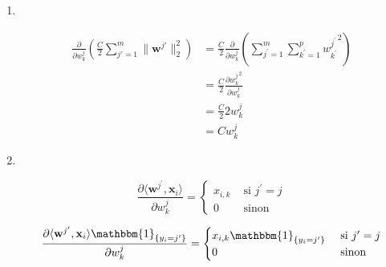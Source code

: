 \documentclass[11pt, french, english]{article}
\def\wkj{w_{k}^{j}}
\begin{document}
\begin{enumerate}
	\item {}\\
	      \begin{reponse}
		      \begin{align*}
			      \frac{\partial}{\partial w_k^j}\left(\frac{C}{2}\sum_{j'=1}^{m} \lVert \mathbf{w}^{j'} \rVert_2^2 \right)
			       & = \frac{C}{2} \frac{\partial}{\partial w_k^j}\left(\sum_{j^{\prime}=1}^{m}\sum_{k^{\prime}=1}^{p} {w_{k^{\prime}}^{j^{\prime}}}^{2}\right) \\
			       & = \frac{C}{2} \frac{\partial {w_{k}^{j}}^2}{\partial w_k^j}                                                                                \\
			       & = \frac{C}{2} 2 w_{k}^{j}                                                                                                                  \\
			       & = Cw_{k}^{j}
		      \end{align*}
	      \end{reponse}

	\item {}\\
	      \begin{reponse}

		      \begin{equation}
			      \label{eq:deriv_prod_scal}
			      \frac{\partial \langle \mathbf{w}^{j^{\prime}}, \mathbf{x}_i \rangle}{\partial\wkj}
			      = \begin{cases}
				      x_{i,k} & \text{ si } j^{\prime} = j \\
				      0       & \text{ sinon }
			      \end{cases}
		      \end{equation}

		      \begin{equation}
			      \label{eq:deriv_prod_scal_1}
			      \frac{\partial \langle \mathbf{w}^{j^{\prime}}, \mathbf{x}_i \rangle\mathbbm{1}_{\{y_i = j^{\prime}\}}}{\partial\wkj}
			      = \begin{cases}
				      x_{i,k}\mathbbm{1}_{\{y_i = j^{\prime}\}} & \text{ si } j^{\prime} = j \\
				      0                                         & \text{ sinon }
			      \end{cases}
		      \end{equation}


\end{reponse}
\end{enumerate}
\end{document}
